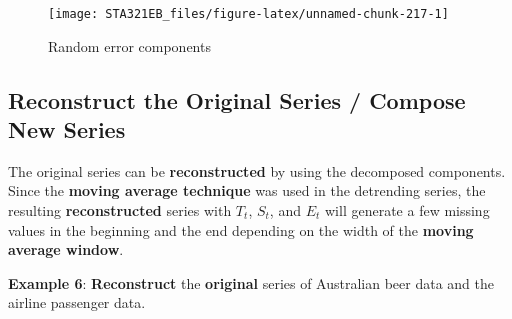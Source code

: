 \documentclass[
]{book}
\begin{document}
\begin{figure}

{\centering \texttt{[image: STA321EB\_files/figure-latex/unnamed-chunk-217-1]} 

}

\caption{Random error components}\label{fig:unnamed-chunk-217}
\end{figure}

\hypertarget{reconstruct-the-original-series-compose-new-series}{%
\subsection{Reconstruct the Original Series / Compose New Series}\label{reconstruct-the-original-series-compose-new-series}}

The original series can be \textbf{reconstructed} by using the decomposed components. Since the \textbf{moving average technique} was used in the detrending series, the resulting \textbf{reconstructed} series with \(T_t\), \(S_t\), and \(E_t\) will generate a few missing values in the beginning and the end depending on the width of the \textbf{moving average window}.

\textbf{Example 6}: \textbf{Reconstruct} the \textbf{original} series of Australian beer data and the airline passenger data.
\end{document}
